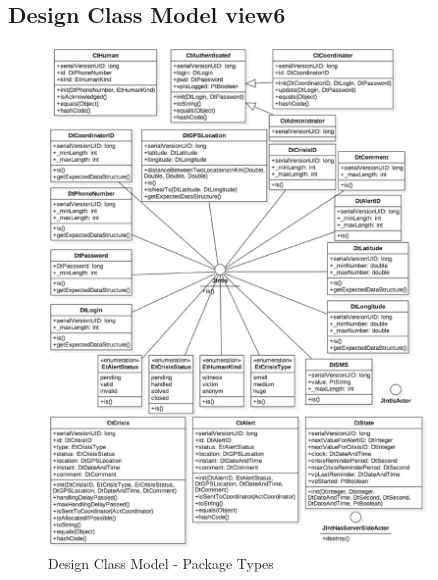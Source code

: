 \subsection{Design Class Model view6}
\begin{figure}[h!]
	\centering
	\includegraphics[width=0.9\textwidth]{./images/dcm_types.eps}
	\caption{Design Class Model - Package Types}
\end{figure}

